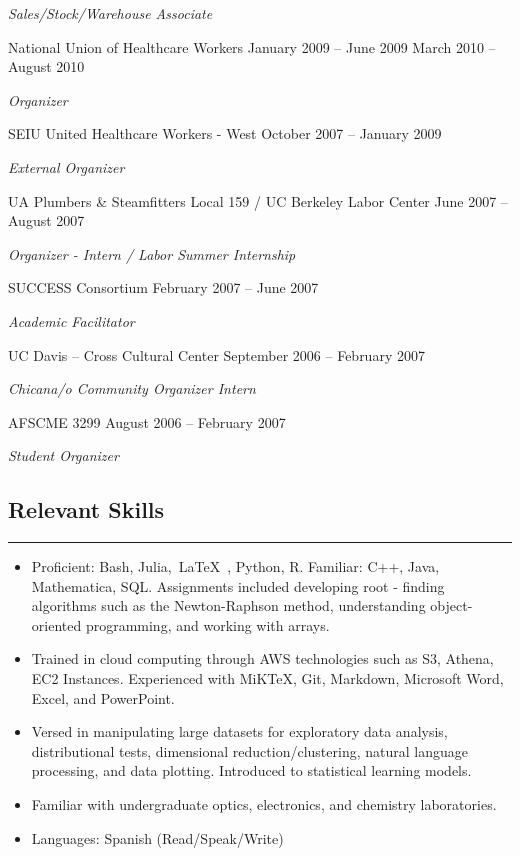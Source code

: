 \documentclass[letterpaper, 10 pt]{article}
\begin{document}
\textit{Sales/Stock/Warehouse Associate} \\
\centerline{National Union of Healthcare Workers  \hfill January 2009 – June 2009 \;\vrule\; March 2010 – August 2010}

\textit{Organizer} \\
\centerline{SEIU United Healthcare Workers - West \hfill October 2007 – January 2009}

\textit{External Organizer}  \\
\centerline{UA Plumbers \& Steamfitters Local 159 / UC Berkeley Labor Center \hfill June 2007 – August 2007}

\textit{Organizer - Intern / Labor Summer Internship} \\
\centerline{SUCCESS Consortium \hfill February 2007 – June 2007}

\textit{Academic Facilitator} \\
\centerline{UC Davis – Cross Cultural Center \hfill September 2006 – February 2007}

\textit{Chicana/o Community Organizer Intern} \\
\centerline{AFSCME 3299 \hfill August 2006 – February 2007}

\textit{Student Organizer} 
\subsection*{Relevant Skills}
\noindent\rule[0.75ex]{\linewidth}{1 pt}
\begin{itemize}
\item Proficient: Bash, Julia, \,\LaTeX\ , Python, R. Familiar: C++, Java, Mathematica, SQL. Assignments included developing root - finding algorithms such as the Newton-Raphson method, understanding object-oriented programming, and working with arrays.
\item Trained in cloud computing through AWS technologies such as S3, Athena, EC2 Instances. Experienced with MiKTeX, Git, Markdown, Microsoft Word, Excel, and PowerPoint.
\item Versed in manipulating large datasets for exploratory data analysis, distributional tests, dimensional reduction/clustering, natural language processing, and data plotting. Introduced to statistical learning models.
\item Familiar with undergraduate optics, electronics, and chemistry laboratories.
\item Languages: Spanish (Read/Speak/Write)
\end{itemize}
\end{document}
